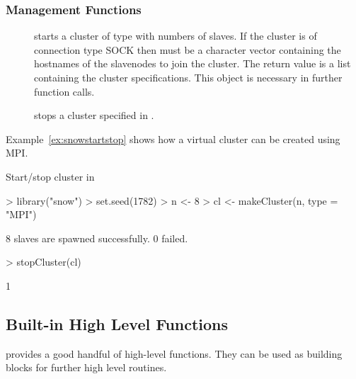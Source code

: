 \subsubsection{Management Functions}
\begin{description}
\item[]
  starts a cluster of type  with  numbers of
  slaves. If the cluster is of connection type SOCK then 
  must be a character vector containing the hostnames of the
  slavenodes to join the cluster. The return value is a list
  containing the cluster specifications. This object is necessary in
  further function calls.
\item[] stops a cluster specified in .
\end{description}

Example~\ref{ex:snowstartstop} shows how a virtual cluster can be
created using MPI. 

\begin{Example} Start/stop cluster in 
\begin{Schunk}
\begin{Sinput}
> library("snow")
> set.seed(1782)
> n <- 8
> cl <- makeCluster(n, type = "MPI")
\end{Sinput}
\begin{Soutput}
	8 slaves are spawned successfully. 0 failed.
\end{Soutput}
\begin{Sinput}
> stopCluster(cl)
\end{Sinput}
\begin{Soutput}
[1] 1
\end{Soutput}
\end{Schunk}
\label{ex:snowstartstop}
\end{Example}

\subsection{Built-in High Level Functions}

 provides a good handful of high-level functions. They can
be used as building blocks for further high level routines.


